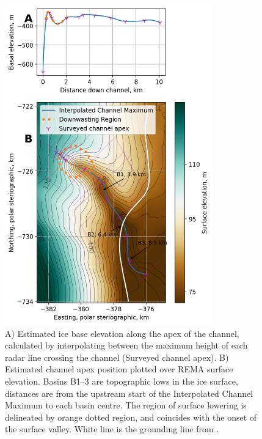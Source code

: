 \begin{figure}[!ht]
\centering
\includegraphics[width=0.8\textwidth]{chapters/2/thickness_surfacecolour.png}
\caption[Ice base profile]{A) Estimated ice base elevation along the apex of the channel, calculated by interpolating between the maximum height of each radar line crossing the channel (Surveyed channel apex). B) Estimated channel apex position plotted over REMA surface elevation. Basins B1--3 are topographic lows in the ice surface, distances are from the upstream start of the Interpolated Channel Maximum to each basin centre. The region of surface lowering is delineated by orange dotted region, and coincides with the onset of the surface valley. White line is the grounding line from \cite{depoorter2013amii}.}
\label{fig:thickness_surfacecolour}
\end{figure}  

